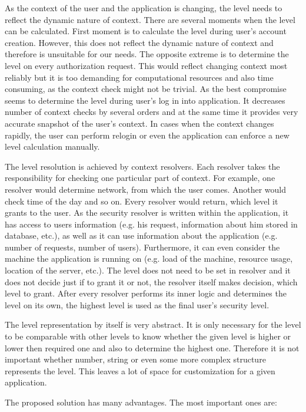 \documentclass{poster15}
\begin{document}
As the context of the user and the application is changing, the level needs to reflect the dynamic nature of context. There are several moments when the level can be calculated. First moment is to calculate the level during user's account creation. However, this does not reflect the dynamic nature of context and therefore is unsuitable for our needs. The opposite extreme is to determine the level on every authorization request. This would reflect changing context most reliably but it is too demanding for computational resources and also time consuming, as the context check might not be trivial. As the best compromise seems to determine the level during user's log in into application. It decreases number of context checks by several orders and at the same time it provides very accurate snapshot of the user's context. In cases when the context changes rapidly, the user can perform relogin or even the application can enforce a new level calculation manually.

The level resolution is achieved by context resolvers. Each resolver takes the responsibility for checking one particular part of context. For example, one resolver would determine network, from which the user comes. Another would check time of the day and so on. Every resolver would return, which level it grants to the user. As the security resolver is written within the application, it has access to users information (e.g. his request, information about him stored in database, etc.), as well as it can use information about the application (e.g. number of requests, number of users). Furthermore, it can even consider the machine the application is running on (e.g. load of the machine, resource usage, location of the server, etc.). The level does not need to be set in resolver and it does not decide just if to grant it or not, the resolver itself makes decision, which level to grant. After every resolver performs its inner logic and determines the level on its own, the highest level is used as the final user's security level.

The level representation by itself is very abstract. It is only necessary for the level to be comparable with other levels to know whether the given level is higher or lower then required one and also to determine the highest one. Therefore it is not important whether number, string or even some more complex structure represents the level. This leaves a lot of space for customization for a given application.

The proposed solution has many advantages. The most important ones are:
\end{document}
